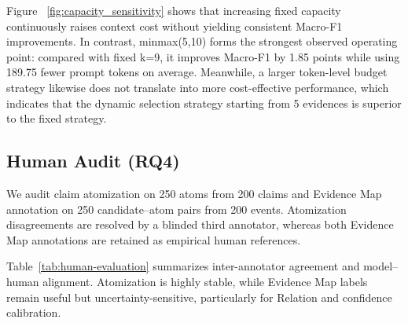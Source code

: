 \documentclass[letterpaper]{article}
\begin{document}
Figure ~\ref{fig:capacity_sensitivity} shows that increasing fixed capacity continuously raises context cost without yielding consistent Macro-F1 improvements. In contrast, minmax(5,10) forms the strongest observed operating point: compared with fixed k=9, it improves Macro-F1 by 1.85 points while using 189.75 fewer prompt tokens on average. Meanwhile, a larger token-level budget strategy likewise does not translate into more cost-effective performance, which indicates that the dynamic selection strategy starting from 5 evidences is superior to the fixed strategy.

\subsection{Human Audit (RQ4)}
\label{sec:human-audit}

We audit claim atomization on 250 atoms from 200 claims and
Evidence Map annotation on 250 candidate--atom pairs from 200
events. Atomization disagreements are resolved by a blinded third
annotator, whereas both Evidence Map annotations are retained as
empirical human references. 

Table~\ref{tab:human-evaluation}
summarizes inter-annotator agreement and model--human alignment.
Atomization is highly stable, while Evidence Map labels remain
useful but uncertainty-sensitive, particularly for Relation and
confidence calibration.
\end{document}
